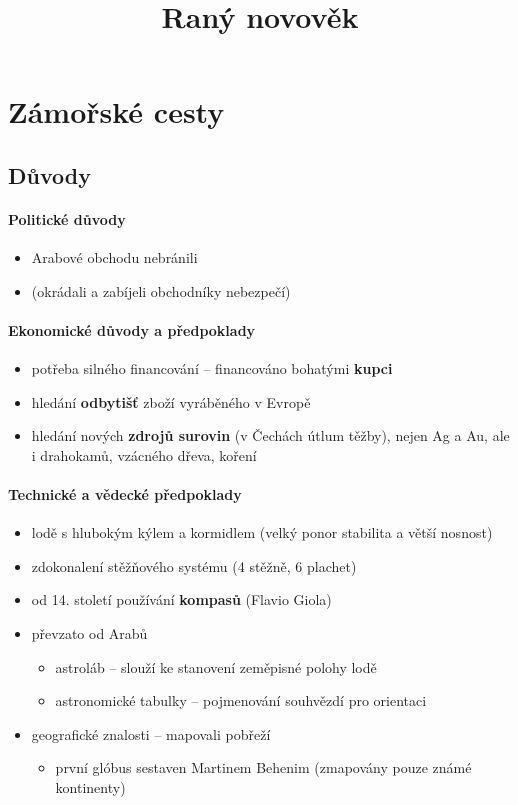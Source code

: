 \title{Raný novověk}


\section{Zámořské cesty}
\subsection{Důvody}
\paragraph{Politické důvody}
\begin{itemize}
\item Arabové obchodu nebránili
\item {} (okrádali a zabíjeli obchodníky \ra nebezpečí)
\end{itemize}

\paragraph{Ekonomické důvody a předpoklady}
\begin{itemize}
\item potřeba silného financování -- financováno bohatými \textbf{kupci}
\item hledání \textbf{odbytišť} zboží vyráběného v Evropě
\item hledání nových \textbf{zdrojů surovin} (v Čechách útlum těžby), nejen Ag a Au, ale i drahokamů, vzácného dřeva, koření
\end{itemize}

\paragraph{Technické a vědecké předpoklady}
\begin{itemize}
\item lodě s hlubokým kýlem a kormidlem (velký ponor \ra stabilita a větší nosnost)
\item zdokonalení stěžňového systému (4 stěžně, 6 plachet)
\item od 14. století používání \textbf{kompasů} (Flavio Giola)
\item převzato od Arabů
	\begin{itemize}
	\item astroláb -- slouží ke stanovení zeměpisné polohy lodě 
	\item astronomické tabulky -- pojmenování souhvězdí pro orientaci 
	\end{itemize}
\item geografické znalosti -- mapovali pobřeží
	\begin{itemize}
	\item první glóbus sestaven Martinem Behenim (zmapovány pouze známé kontinenty)
	\end{itemize}
\end{itemize}

